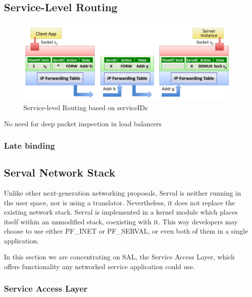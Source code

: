 \subsection{Service-Level Routing}
\begin{figure}
\centering
{}
\includegraphics[scale=0.3]{figures/service_level_routing}
\caption[Service-Level Routing]{Service-level Routing based on serviceIDs}
\label{fig:ser_resol}
\end{figure}
No need for deep packet inspection in load balancers
\subsubsection{Late binding}
\fi






\subsection{Serval Network Stack}
Unlike other next-generation networking proposals, Serval is neither running in the user space, nor is using a translator.
Nevertheless, it does not replace the existing network stack.
Serval is implemented in a kernel module which places itself within an unmodified stack, coexisting with it.
This way developers may choose to use either PF\_INET or PF\_SERVAL, or even both of them in a single application.

In this section we are concentrating on SAL, the Service Access Layer, which offers functionality any
networked service application could use.


\subsubsection{Service Access Layer}

